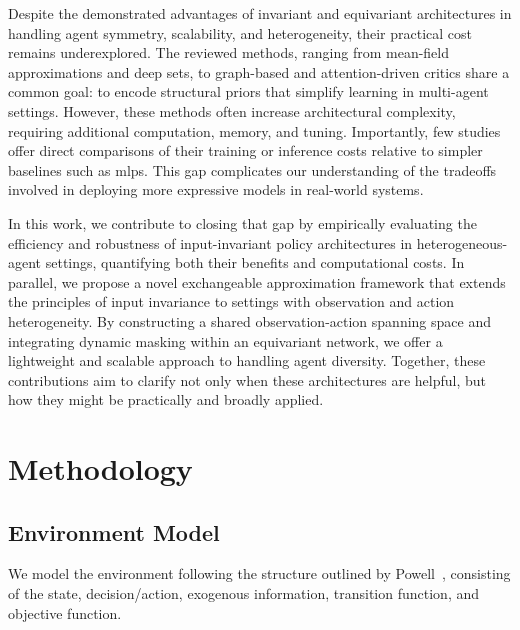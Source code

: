 \documentclass{article}
\begin{document}
Despite the demonstrated advantages of invariant and equivariant architectures in handling 
agent symmetry, scalability, and heterogeneity, their practical cost remains underexplored. 
The reviewed methods, ranging from mean-field approximations and deep sets, 
to graph-based and attention-driven critics share a common goal: to encode 
structural priors that simplify learning in multi-agent settings. However, 
these methods often increase architectural complexity, requiring additional computation, 
memory, and tuning. Importantly, few studies offer direct comparisons of their 
training or inference costs relative to simpler baselines such as \glspl{mlp}. 
This gap complicates our understanding of the tradeoffs involved in deploying 
more expressive models in real-world systems.

In this work, we contribute to closing that gap by empirically evaluating the efficiency 
and robustness of input-invariant policy architectures in heterogeneous-agent settings, 
quantifying both their benefits and computational costs. In parallel, we 
propose a novel exchangeable approximation framework that extends the principles 
of input invariance to settings with observation and action heterogeneity. 
By constructing a shared observation-action spanning space and integrating dynamic 
masking within an equivariant network, we offer a lightweight and scalable 
approach to handling agent diversity. Together, these contributions aim to 
clarify not only when these architectures are helpful, 
but how they might be practically and broadly applied.


\section{Methodology}
\label{con2:sec:methodology}



\subsection{Environment Model}

We model the environment following the structure outlined by Powell~\cite{powell2022}, 
consisting of the state, decision/action, exogenous information, transition function, and 
objective function.
\end{document}
